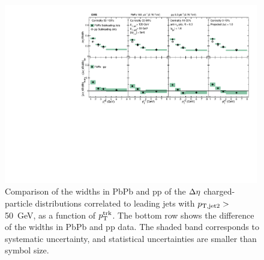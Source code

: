 \begin{figure}[hbtp]
\begin{center}
\includegraphics[width=0.99\textwidth]{figures/Results/Width_Eta_SubLeading.pdf}
\caption[Subleading jet $\Delta\eta$ correlation widths as a function of $p_{\rm T}^{\rm trk}$ at 2.76 TeV]{Comparison of the widths in PbPb and pp of the $\protect\Delta\eta$ charged-particle distributions correlated to leading jets with $p_{\rm T, jet2}>$ 50~GeV, as a function of $p_{\rm T}^{\rm trk}$.  The bottom row shows the difference of the widths in PbPb and pp data.  The shaded band corresponds to systematic uncertainty, and statistical uncertainties are smaller than symbol size.}
\label{fig:Width_eta_sub}
\end{center}
\end{figure}


